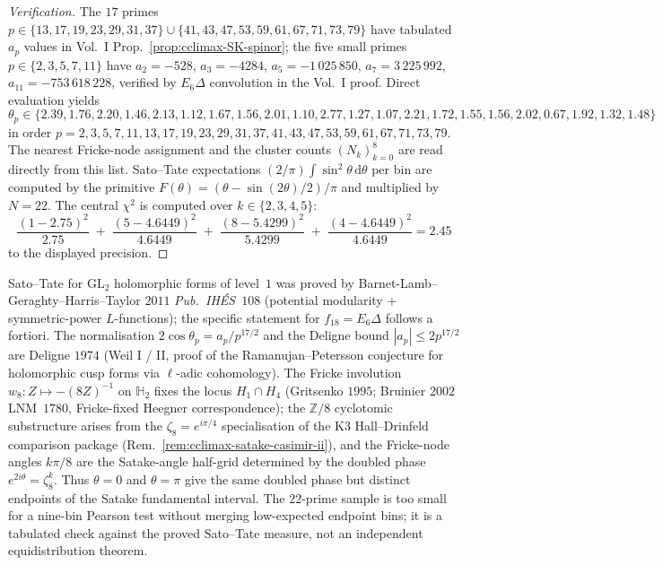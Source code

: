 \begin{proof}[Verification]
The $17$ primes $p \in \{13, 17, 19, 23, 29, 31, 37\} \cup \{41,
43, 47, 53, 59, 61, 67, 71, 73, 79\}$ have tabulated $a_p$ values
in Vol.~I Prop.~\ref{prop:cclimax-SK-spinor}; the five small primes
$p \in \{2, 3, 5, 7, 11\}$ have
$a_2 = -528$, $a_3 = -4284$, $a_5 = -1\,025\,850$,
$a_7 = 3\,225\,992$, $a_{11} = -753\,618\,228$, verified by
$E_6\Delta$ convolution in the Vol.~I proof.
Direct evaluation yields
\[
\theta_p \in \{2.39, 1.76, 2.20, 1.46, 2.13, 1.12, 1.67, 1.56,
2.01, 1.10, 2.77, 1.27, 1.07, 2.21, 1.72, 1.55, 1.56, 2.02,
0.67, 1.92, 1.32, 1.48\}
\]
in order $p = 2, 3, 5, 7, 11, 13, 17, 19, 23, 29, 31, 37, 41, 43,
47, 53, 59, 61, 67, 71, 73, 79$. The nearest Fricke-node assignment
and the cluster counts $(N_k)_{k=0}^{8}$ are read directly from
this list. Sato--Tate expectations $(2/\pi)\int\sin^2\theta\,
\mathrm d\theta$ per bin are computed by the primitive
$F(\theta) = (\theta - \sin(2\theta)/2)/\pi$ and multiplied by
$N = 22$. The central $\chi^2$ is computed over $k \in \{2,3,4,5\}$:
\[
\frac{(1-2.75)^2}{2.75}
\;+\;
\frac{(5-4.6449)^2}{4.6449}
\;+\;
\frac{(8-5.4299)^2}{5.4299}
\;+\;
\frac{(4-4.6449)^2}{4.6449}
=2.45
\]
to the displayed precision.
\end{proof}

\begin{remark}
\label{rem:stqp-theta-scope}
Sato--Tate for $\mathrm{GL}_2$ holomorphic forms of level~$1$ was
proved by Barnet-Lamb--Geraghty--Harris--Taylor $2011$
\emph{Pub.~IH\'ES}~$108$ (potential modularity +
symmetric-power $L$-functions); the specific statement for
$f_{18}=E_6\Delta$ follows a fortiori. The normalisation
$2\cos\theta_p = a_p/p^{17/2}$
and the Deligne bound $|a_p| \le 2 p^{17/2}$ are
Deligne $1974$ (Weil I / II, proof of the Ramanujan--Petersson
conjecture for holomorphic cusp forms via $\ell$-adic cohomology).
The Fricke involution $w_8: Z \mapsto -(8Z)^{-1}$ on
$\mathbb H_2$ fixes the locus $H_1 \cap H_4$ (Gritsenko
$1995$; Bruinier $2002$ LNM~$1780$, Fricke-fixed Heegner correspondence);
the $\mathbb Z/8$ cyclotomic substructure arises from the
$\zeta_8 = e^{i\pi/4}$ specialisation of the K3 Hall--Drinfeld
comparison package
(Rem.~\ref{rem:cclimax-satake-casimir-ii}), and the
Fricke-node angles $k\pi/8$ are the Satake-angle half-grid determined
by the doubled phase $e^{2i\theta}=\zeta_8^k$. Thus
$\theta=0$ and $\theta=\pi$ give the same doubled phase but distinct
endpoints of the Satake fundamental interval. The $22$-prime sample
is too small for a nine-bin Pearson test without merging low-expected
endpoint bins; it is a tabulated check against the proved
Sato--Tate measure, not an independent equidistribution theorem.
\end{remark}

